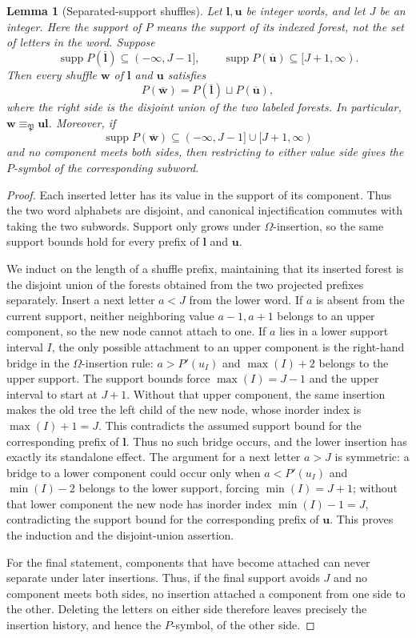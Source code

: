 \documentclass{amsart}
\newtheorem{lemma}{Lemma}[subsection]
\theoremstyle{definition}
\theoremstyle{remark}
\numberwithin{equation}{subsection}
\newcommand{\forest}{\mathfrak{P}}
\begin{document}
\begin{lemma}[Separated-support shuffles]\label{lemma:forestseparatedshuffle}
Let $\mathbf l,\mathbf u$ be integer words, and let $J$ be an integer. Here the support of $P$ means the support of its indexed forest, not the set of letters in the word. Suppose
$$\operatorname{supp}P(\overline{\mathbf l})\subseteq(-\infty,J-1],
\qquad
\operatorname{supp}P(\overline{\mathbf u})\subseteq[J+1,\infty).$$
Then every shuffle $\mathbf w$ of $\mathbf l$ and $\mathbf u$ satisfies
$$P(\overline{\mathbf w})=
P(\overline{\mathbf l})\sqcup P(\overline{\mathbf u}),$$
where the right side is the disjoint union of the two labeled forests. In particular, $\mathbf w\equiv_\forest\mathbf u\mathbf l$.
Moreover, if
$$\operatorname{supp}P(\overline{\mathbf w})
 \subseteq(-\infty,J-1]\cup[J+1,\infty)$$
and no component meets both sides, then restricting to either value side gives the $P$-symbol of the corresponding subword.
\end{lemma}
\begin{proof}
Each inserted letter has its value in the support of its component. Thus the two word alphabets are disjoint, and canonical injectification commutes with taking the two subwords. Support only grows under $\Omega$-insertion, so the same support bounds hold for every prefix of $\mathbf l$ and $\mathbf u$.

We induct on the length of a shuffle prefix, maintaining that its inserted forest is the disjoint union of the forests obtained from the two projected prefixes separately. Insert a next letter $a<J$ from the lower word. If $a$ is absent from the current support, neither neighboring value $a-1,a+1$ belongs to an upper component, so the new node cannot attach to one. If $a$ lies in a lower support interval $I$, the only possible attachment to an upper component is the right-hand bridge in the $\Omega$-insertion rule: $a>P'(u_I)$ and $\max(I)+2$ belongs to the upper support. The support bounds force $\max(I)=J-1$ and the upper interval to start at $J+1$. Without that upper component, the same insertion makes the old tree the left child of the new node, whose inorder index is $\max(I)+1=J$. This contradicts the assumed support bound for the corresponding prefix of $\mathbf l$. Thus no such bridge occurs, and the lower insertion has exactly its standalone effect. The argument for a next letter $a>J$ is symmetric: a bridge to a lower component could occur only when $a<P'(u_I)$ and $\min(I)-2$ belongs to the lower support, forcing $\min(I)=J+1$; without that lower component the new node has inorder index $\min(I)-1=J$, contradicting the support bound for the corresponding prefix of $\mathbf u$. This proves the induction and the disjoint-union assertion.

For the final statement, components that have become attached can never separate under later insertions. Thus, if the final support avoids $J$ and no component meets both sides, no insertion attached a component from one side to the other. Deleting the letters on either side therefore leaves precisely the insertion history, and hence the $P$-symbol, of the other side.
\end{proof}
\end{document}
